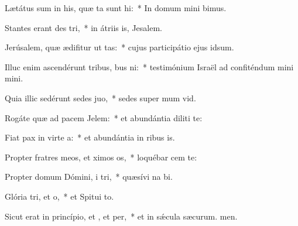 \item Lætátus sum in his, quæ ta sunt hi:~* In domum mini bimus.
\item Stantes erant des tri,~* in átriis is, Jesalem.
\item Jerúsalem, quæ ædifitur ut tas:~* cujus participátio ejus  idsum.
\item Illuc enim ascendérunt tribus, bus ni:~* testimónium Israël ad confiténdum mini mini.
\item Quia illic sedérunt sedes  juo,~* sedes super mum vid.
\item Rogáte quæ ad pacem  Jelem:~* et abundántia diliti te:
\item Fiat pax in virte a:~* et abundántia in ribus is.
\item Propter fratres meos, et ximos os,~* loquébar cem  te:
\item Propter domum Dómini, i tri,~* quæsívi na bi.
\item Glória tri, et o,~* et Spitui to.
\item Sicut erat in princípio, et , et per,~* et in sǽcula sæcurum. men.
